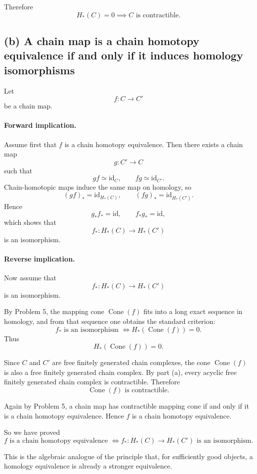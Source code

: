 \documentclass[12pt,a4paper]{article}
\theoremstyle{notespace}
\begin{document}
Therefore
\[
\boxed{H_*(C)=0 \implies C \text{ is contractible}.}
\]

\subsection*{(b) A chain map is a chain homotopy equivalence if and only if it induces homology isomorphisms}

Let
\[
f:C\to C'
\]
be a chain map.

\paragraph{Forward implication.}
Assume first that \(f\) is a chain homotopy equivalence. Then there exists a chain map
\[
g:C'\to C
\]
such that
\[
gf\simeq \mathrm{id}_C,\qquad fg\simeq \mathrm{id}_{C'}.
\]
Chain-homotopic maps induce the same map on homology, so
\[
(gf)_*=\mathrm{id}_{H_*(C)},\qquad (fg)_*=\mathrm{id}_{H_*(C')}.
\]
Hence
\[
g_*f_*=\mathrm{id},\qquad f_*g_*=\mathrm{id},
\]
which shows that
\[
f_*:H_*(C)\to H_*(C')
\]
is an isomorphism.

\paragraph{Reverse implication.}
Now assume that
\[
f_*:H_*(C)\to H_*(C')
\]
is an isomorphism.

By Problem 5, the mapping cone \(\operatorname{Cone}(f)\) fits into a long exact sequence in homology, and from that sequence one obtains the standard criterion:
\[
f_* \text{ is an isomorphism } \Longleftrightarrow H_*(\operatorname{Cone}(f))=0.
\]
Thus
\[
H_*(\operatorname{Cone}(f))=0.
\]

Since \(C\) and \(C'\) are free finitely generated chain complexes, the cone \(\operatorname{Cone}(f)\) is also a free finitely generated chain complex. By part (a), every acyclic free finitely generated chain complex is contractible. Therefore
\[
\operatorname{Cone}(f)\text{ is contractible}.
\]

Again by Problem 5, a chain map has contractible mapping cone if and only if it is a chain homotopy equivalence. Hence \(f\) is a chain homotopy equivalence.

So we have proved
\[
\boxed{
	f \text{ is a chain homotopy equivalence }
	\Longleftrightarrow
	f_*:H_*(C)\to H_*(C') \text{ is an isomorphism}.
}
\]

This is the algebraic analogue of the principle that, for sufficiently good objects, a homology equivalence is already a stronger equivalence.
\end{document}

